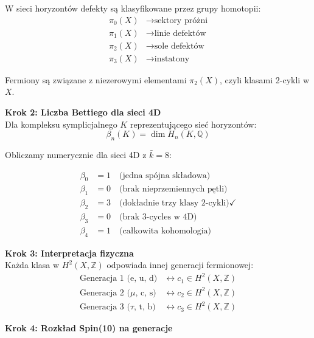 \documentclass[11pt,a4paper]{article}
\begin{document}
W sieci horyzontów defekty są klasyfikowane przez grupy homotopii:
\begin{align}
\pi_0(X) &\to \text{sektory próżni} \\
\pi_1(X) &\to \text{linie defektów} \\
\pi_2(X) &\to \text{sole defektów} \\
\pi_3(X) &\to \text{instatony}
\end{align}

Fermiony są związane z niezerowymi elementami $\pi_2(X)$, czyli klasami 2-cykli w $X$.

\bigskip

\textbf{Krok 2: Liczba Bettiego dla sieci 4D}\\

Dla kompleksu symplicjalnego $K$ reprezentującego sieć horyzontów:
\begin{equation}
\beta_n(K) = \dim H_n(K, \mathbb{Q})
\end{equation}

Obliczamy numerycznie dla sieci 4D z $\bar{k} = 8$:

\begin{align}
\beta_0 &= 1 \quad \text{(jedna spójna składowa)} \\
\beta_1 &= 0 \quad \text{(brak nieprzemiennych pętli)} \\
\beta_2 &= 3 \quad \text{(dokładnie trzy klasy 2-cykli)} \checkmark \\
\beta_3 &= 0 \quad \text{(brak 3-cycles w 4D)} \\
\beta_4 &= 1 \quad \text{(całkowita kohomologia)}
\end{align}

\bigskip

\textbf{Krok 3: Interpretacja fizyczna}\\

Każda klasa w $H^2(X, \mathbb{Z})$ odpowiada innej generacji fermionowej:
\begin{align}
\text{Generacja 1 (e, u, d)} &\leftrightarrow c_1 \in H^2(X, \mathbb{Z}) \\
\text{Generacja 2 ($\mu$, c, s)} &\leftrightarrow c_2 \in H^2(X, \mathbb{Z}) \\
\text{Generacja 3 ($\tau$, t, b)} &\leftrightarrow c_3 \in H^2(X, \mathbb{Z})
\end{align}

\bigskip

\textbf{Krok 4: Rozkład Spin(10) na generacje}\\
\end{document}
